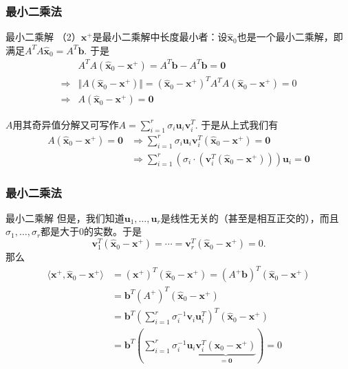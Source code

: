 
\begin{frame}
\frametitle{最小二乘法}

\begin{block}{最小二乘解}
（2）$\mathbf{x}^+$是最小二乘解中长度最小者：设$\widehat{\mathbf{x}}_0$也是一个最小二乘解，即满足$A^TA\widehat{\mathbf{x}}_0 = A^T\mathbf{b}$. 于是
\begin{align*}
& A^TA(\widehat{\mathbf{x}}_0-\mathbf{x}^+) = A^T\mathbf{b} - A^T\mathbf{b} = \mathbf{0} \\
\Longrightarrow & \Vert A (\widehat{\mathbf{x}}_0-\mathbf{x}^+) \Vert = (\widehat{\mathbf{x}}_0-\mathbf{x}^+)^T A^TA (\widehat{\mathbf{x}}_0-\mathbf{x}^+) = 0 \\
\Longrightarrow & A (\widehat{\mathbf{x}}_0-\mathbf{x}^+) = \mathbf{0}
\end{align*}

\pause

$A$用其奇异值分解又可写作$A = \sum\limits_{i=1}^r \sigma_i \mathbf{u}_i \mathbf{v}_i^T$. 于是从上式我们有
\begin{align*}
A (\widehat{\mathbf{x}}_0-\mathbf{x}^+) = \mathbf{0} & \Longrightarrow \sum\limits_{i=1}^r \sigma_i \mathbf{u}_i \mathbf{v}_i^T (\widehat{\mathbf{x}}_0-\mathbf{x}^+) = \mathbf{0} \\
& \Longrightarrow \sum\limits_{i=1}^r \left( \sigma_i \cdot \left( \mathbf{v}_i^T (\widehat{\mathbf{x}}_0-\mathbf{x}^+) \right) \right) \mathbf{u}_i = \mathbf{0}
\end{align*}
\end{block}

\end{frame}


\begin{frame}
\frametitle{最小二乘法}

\begin{block}{最小二乘解}
但是，我们知道$\mathbf{u}_1,\ldots,\mathbf{u}_r$是线性无关的（甚至是相互正交的），而且$\sigma_1,\ldots,\sigma_r$都是大于0的实数。于是
$$\mathbf{v}_1^T (\widehat{\mathbf{x}}_0-\mathbf{x}^+) = \cdots = \mathbf{v}_r^T (\widehat{\mathbf{x}}_0-\mathbf{x}^+) = 0.$$
那么
\begin{align*}
\langle \mathbf{x}^+, \widehat{\mathbf{x}}_0 - \mathbf{x}^+ \rangle & = (\mathbf{x}^+)^T (\widehat{\mathbf{x}}_0 - \mathbf{x}^+) = (A^+\mathbf{b})^T (\widehat{\mathbf{x}}_0 - \mathbf{x}^+) \\
& = \mathbf{b}^T (A^+)^T (\widehat{\mathbf{x}}_0 - \mathbf{x}^+) \\
& = \mathbf{b}^T \left( \sum\limits_{i=1}^r \sigma_i^{-1} \mathbf{v}_i \mathbf{u}_i^T \right)^T (\widehat{\mathbf{x}}_0 - \mathbf{x}^+) \\
& = \mathbf{b}^T \left( \sum\limits_{i=1}^r \sigma_i^{-1} \mathbf{u}_i \underbrace{\mathbf{v}_i^T (\widehat{\mathbf{x}}_0 - \mathbf{x}^+)}_{=\mathbf{0}} \right) = 0
\end{align*}
\end{block}

\end{frame}

